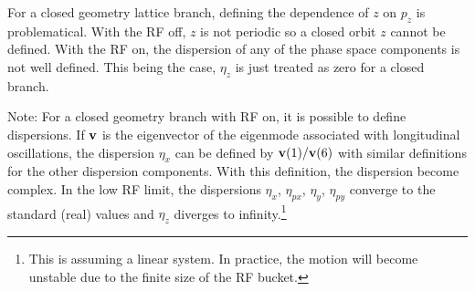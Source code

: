 For a closed geometry lattice branch, defining the dependence of $z$ on $p_z$ is problematical.
With the RF off, $z$ is not periodic so a closed orbit $z$ cannot be defined.  With the RF on, the
dispersion of any of the phase space components is not well defined.  This being the case, $\eta_z$
is just treated as zero for a closed branch.  

Note: For a closed geometry branch with RF on, it is possible to define dispersions. If ${\bf v}$ is
the eigenvector of the eigenmode associated with longitudinal oscillations, the dispersion $\eta_x$
can be defined by ${\bf v}(1) / {\bf v}(6)$ with similar definitions for the other dispersion components.
With this definition, the dispersion become complex. In the low RF limit, the dispersions $\eta_x$,
$\eta_{px}$, $\eta_y$, $\eta_{py}$ converge to the standard (real) values and $\eta_z$ diverges
to infinity.\footnote
  {
This is assuming a linear system. In practice, the motion will become unstable due to
the finite size of the RF bucket.
  }
